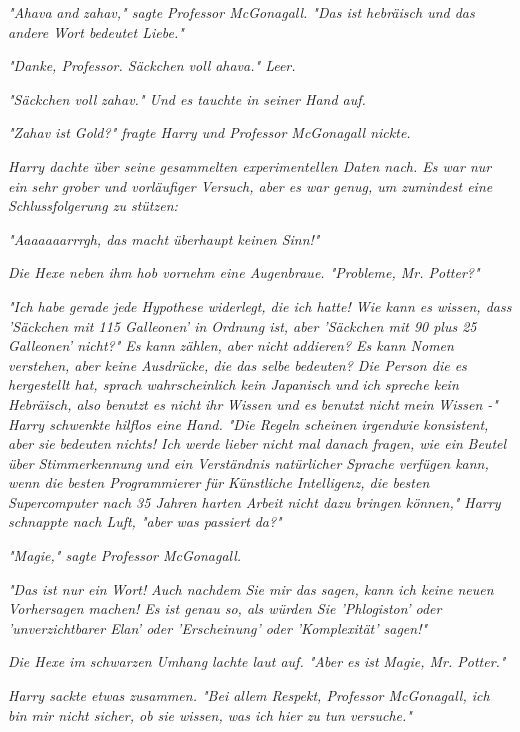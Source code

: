 {\emph{"\emph{Ahava}} \emph{and} \emph{\emph{zahav,}" sagte Professor McGonagall. "Das ist hebräisch und das andere Wort bedeutet Liebe."}

\emph{"Danke, Professor. Säckchen voll} \emph{\emph{ahava.}" Leer.}

\emph{"Säckchen voll} \emph{\emph{zahav.}" Und es tauchte in seiner Hand auf.}

\emph{"Zahav ist Gold?" fragte Harry und Professor McGonagall nickte.}

\emph{Harry dachte über seine gesammelten experimentellen Daten nach. Es war nur ein sehr grober und vorläufiger Versuch, aber es war genug, um zumindest eine Schlussfolgerung zu stützen:}

\emph{"\emph{Aaaaaaarrrgh, das macht überhaupt keinen Sinn!}"}

\emph{Die Hexe neben ihm hob vornehm eine Augenbraue. "Probleme, Mr. Potter?"}

\emph{"Ich habe gerade jede Hypothese widerlegt, die ich hatte! Wie kann es wissen, dass 'Säckchen mit 115 Galleonen' in Ordnung ist, aber 'Säckchen mit 90 plus 25 Galleonen' nicht?" Es kann} \emph{\emph{zählen}, aber nicht} \emph{\emph{addieren}? Es kann Nomen verstehen, aber keine Ausdrücke, die das selbe bedeuten? Die Person die es hergestellt hat, sprach wahrscheinlich kein Japanisch und} \emph{\emph{ich}} \emph{spreche kein Hebräisch, also benutzt es nicht} \emph{\emph{ihr}} \emph{Wissen und es benutzt nicht} \emph{\emph{mein}} \emph{Wissen -" Harry schwenkte hilflos eine Hand. "Die Regeln scheinen} \emph{\emph{irgendwie}} \emph{konsistent, aber sie} \emph{\emph{bedeuten}} \emph{nichts! Ich werde lieber nicht mal danach fragen, wie ein} \emph{\emph{Beutel}} \emph{über Stimmerkennung und ein Verständnis natürlicher Sprache verfügen kann, wenn die besten Programmierer für Künstliche Intelligenz, die besten Supercomputer nach 35 Jahren harten Arbeit nicht dazu bringen können," Harry schnappte nach Luft, "aber} \emph{\emph{was passiert}} \emph{da?"}

\emph{"Magie," sagte Professor McGonagall.}

\emph{"Das ist nur ein} \emph{\emph{Wort!}} \emph{Auch nachdem Sie mir das sagen, kann ich keine neuen Vorhersagen machen! Es ist genau so, als würden Sie 'Phlogiston' oder 'unverzichtbarer Elan' oder 'Erscheinung' oder 'Komplexität' sagen!"}

\emph{Die Hexe im schwarzen Umhang lachte laut auf. "Aber es} \emph{\emph{ist}} \emph{Magie, Mr. Potter."}

\emph{Harry sackte etwas zusammen. "Bei allem Respekt, Professor McGonagall, ich bin mir nicht sicher, ob sie wissen, was ich hier zu tun versuche."}

}
